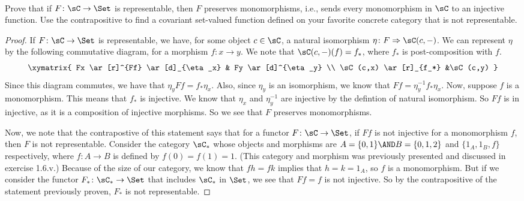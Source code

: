\documentclass[../../main]{subfiles}
\begin{document}
\paragraph{}
\begin{exercise}
	 Prove that if $F\colon \sC \rightarrow \Set$ is representable, then $F$
	 preserves monomorphisms, i.e., sends every monomorphism in $\sC$ to
	 an injective function. Use the contrapositive to find a covariant
	 set-valued function defined on your favorite concrete category that is not
	 representable.
\end{exercise}

\begin{proof}

If $F \colon \sC \rightarrow  \Set$ is representable, we have, for some object
$c \in \sC$, a natural isomorphism $\eta\colon F \Rightarrow \sC(c,-)$. We can
represent $\eta$ by the following commutative diagram, for a morphism $f\colon
x\rightarrow y$. We note that $\sC(c,-)(f) = f_*$, where $f_*$ is
post-composition with $f$.
$$
\xymatrix{
Fx
\ar[r]^{Ff}
\ar[d]_{\eta_x}
& Fy
\ar[d]^{\eta_y}
\\
\sC(c,x)
\ar[r]_{f_*}
&\sC(c,y)
}
$$
Since this diagram commutes, we have that $\eta_yFf = f_* \eta_x$.  Also, since
$\eta_y$ is an isomorphism, we know that $Ff = \eta_y^{-1}f_*\eta_x$. Now,
suppose $f$ is a monomorphism. This means that $f_*$ is injective. We know that
$\eta_x$ and $\eta_y^{-1}$ are injective by the defintion of natural
isomorphism. So $Ff$ is in injective, as it is a composition of injective
morphisms. So we see that $F$ preserves monomorphisms.

Now, we note that the contrapostive of this statement says that for a functor
$F\colon \sC \rightarrow \Set$, if $Ff$ is not injective for a monomorphism
$f$, then
$F$ is not representable. Consider the category $\sC_*$ whose objects and
morphisms are $ A =\{0,1\} \AND B = \{0,1,2\} $  and $\{1_A, 1_B, f\}$ respectively, where $f
 \colon A \rightarrow B$ is defined by $f(0)=f(1)= 1.$ (This category and
morphism was previously presented and discussed in exercise 1.6.v.) Because of
the size of our category, we know that $fh = fk$ implies that $h = k = 1_A$, so
$f$ is a monomorphism. But if we consider the functor $F_*\colon \sC_* \rightarrow
\Set$ that includes $\sC_*$ in $\Set$, we see that $Ff = f$ is not injective. So
by the contrapositive of the statement previously proven, $F_*$ is not
representable.
\end{proof}
\end{document}
